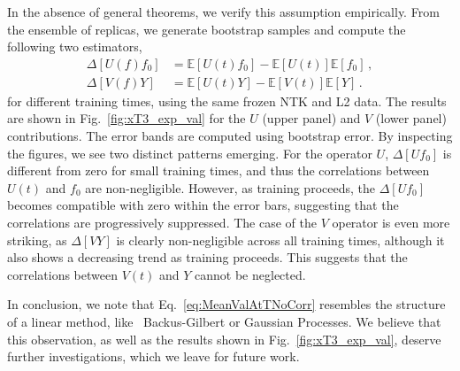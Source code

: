 In the absence of general theorems, we verify this assumption empirically.
From the ensemble of replicas, we generate bootstrap samples and compute the
following two estimators,
\begin{align}
    \label{eq:DeltaExpValUtF0}
    \Delta[U(f)f_0] &= \mathbb{E}\left[U(t) f_{0}\right] 
      - \mathbb{E}\left[U(t) \right] \mathbb{E}\left[f_{0}\right]\, , \\
    \label{eq:DeltaExpValVtY}
    \Delta[V(f)Y] &= \mathbb{E}\left[U(t) Y\right] 
      - \mathbb{E}\left[V(t) \right] \mathbb{E}\left[Y\right]\, .
\end{align}
for different training times, using the same frozen NTK and L2 data. The results
are shown in Fig.~\ref{fig:xT3_exp_val} for the $U$ (upper panel) and $V$ (lower
panel) contributions. The error bands are computed using bootstrap error. By
inspecting the figures, we see two distinct patterns emerging. For the operator 
$U$, $\Delta[U f_0]$ is different from zero for small training times, and thus the
correlations between $U(t)$ and $f_0$ are non-negligible. However, as training
proceeds, the $\Delta[U f_0]$ becomes compatible with zero within the error bars, 
suggesting that the correlations are progressively suppressed.
The case of the $V$ operator is even more striking, as $\Delta[V Y]$ is clearly
non-negligible across all training times, although it also shows a decreasing trend as
training proceeds. This suggests that the correlations between $V(t)$ and $Y$
cannot be neglected. 

In conclusion, we note that Eq.~\eqref{eq:MeanValAtTNoCorr} resembles the structure
of a linear method, like \eg\ Backus-Gilbert or Gaussian Processes. We believe
that this observation, as well as the results shown in
Fig.~\ref{fig:xT3_exp_val}, deserve further investigations, which we leave for
future work.

